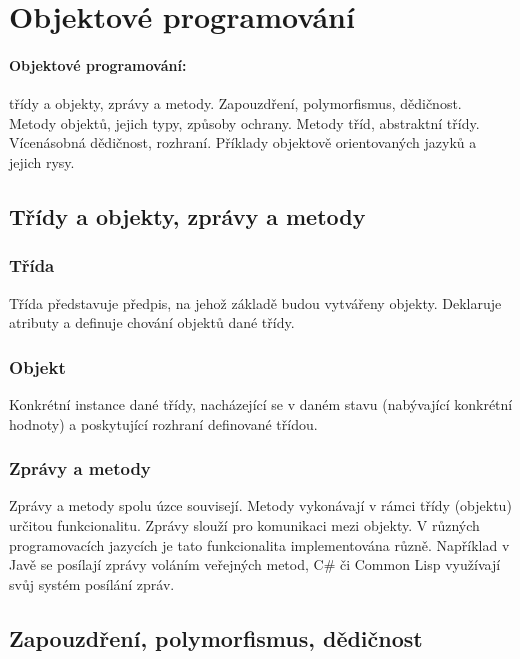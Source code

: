 \documentclass[10pt,a4paper]{article}
\begin{document}

\newpage
\section{Objektové programování}
	\paragraph{Objektové programování:} třídy a objekty, zprávy a metody. Zapouzdření, polymorfismus, dědičnost. Metody objektů, jejich typy, způsoby ochrany. Metody tříd, abstraktní třídy. Vícenásobná dědičnost, rozhraní. Příklady objektově orientovaných jazyků a jejich rysy.

	\subsection{Třídy a objekty, zprávy a metody}
		\subsubsection{Třída}
			Třída představuje předpis, na jehož základě budou vytvářeny objekty. Deklaruje atributy a definuje chování objektů dané třídy.

		\subsubsection{Objekt}
			Konkrétní instance dané třídy, nacházející se v daném stavu (nabývající konkrétní hodnoty) a poskytující rozhraní definované třídou.

		\subsubsection{Zprávy a metody}
			Zprávy a metody spolu úzce souvisejí. Metody vykonávají v rámci třídy (objektu) určitou funkcionalitu. Zprávy slouží pro komunikaci mezi objekty. V různých programovacích jazycích je tato funkcionalita implementována různě. Například v Javě se posílají zprávy voláním veřejných metod, C\# či Common Lisp využívají svůj systém posílání zpráv.


	\subsection{Zapouzdření, polymorfismus, dědičnost}
\end{document}
